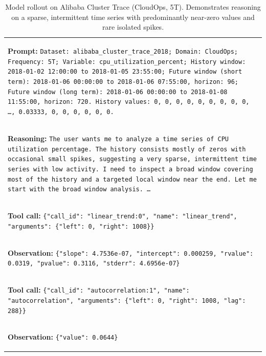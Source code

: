 \documentclass[11pt]{article}
\begin{document}
\begin{table}[t]
\caption{Model rollout on Alibaba Cluster Trace (CloudOps, 5T). Demonstrates reasoning on a sparse, intermittent time series with predominantly near-zero values and rare isolated spikes.}
\label{tab:tstar_sparse_success_case}
\centering
\small
\begin{tabular}{p{}}
\toprule
\colorbox{gray!10}{\parbox{0.95\textwidth}{%
\textbf{Prompt:}
\texttt{Dataset: alibaba\_cluster\_trace\_2018; Domain: CloudOps; Frequency:
5T; Variable: cpu\_utilization\_percent; History window: 2018-01-02
12:00:00 to 2018-01-05 23:55:00; Future window (short term): 2018-01-06
00:00:00 to 2018-01-06 07:55:00, horizon: 96; Future window (long term):
2018-01-06 00:00:00 to 2018-01-08 11:55:00, horizon: 720. History values:
0, 0, 0, 0, 0, 0, 0, 0, 0, \ldots, 0.03333, 0, 0, 0, 0, 0, 0.}
}} \\

\hdashline

\colorbox{green!10}{\parbox{0.95\textwidth}{%
\textbf{Reasoning:}
\texttt{The user wants me to analyze a time series of CPU utilization
percentage. The history consists mostly of zeros with occasional small spikes,
suggesting a very sparse, intermittent time series with low activity. I need to
inspect a broad window covering most of the history and a targeted local window
near the end. Let me start with the broad window analysis. \ldots}
}} \\

\hdashline

\colorbox{red!10}{\parbox{0.95\textwidth}{%
\textbf{Tool call:}
\texttt{\{"call\_id": "linear\_trend:0", "name": "linear\_trend",
"arguments": \{"left": 0, "right": 1008\}\}}
}} \\

\colorbox{blue!10}{\parbox{0.95\textwidth}{%
\textbf{Observation:}
\texttt{\{"slope": 4.7536e-07, "intercept": 0.000259, "rvalue": 0.0319,
"pvalue": 0.3116, "stderr": 4.6956e-07\}}
}} \\

\hdashline

\colorbox{red!10}{\parbox{0.95\textwidth}{%
\textbf{Tool call:}
\texttt{\{"call\_id": "autocorrelation:1", "name": "autocorrelation",
"arguments": \{"left": 0, "right": 1008, "lag": 288\}\}}
}} \\

\colorbox{blue!10}{\parbox{0.95\textwidth}{%
\textbf{Observation:}
\texttt{\{"value": 0.0644\}}
}} \\


\end{tabular}
\end{table}
\end{document}
